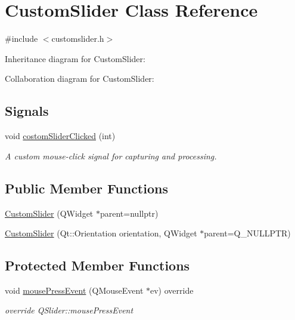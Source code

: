 \hypertarget{class_custom_slider}{}\section{Custom\+Slider Class Reference}
\label{class_custom_slider}


{\ttfamily \#include $<$customslider.\+h$>$}



Inheritance diagram for Custom\+Slider\+:


Collaboration diagram for Custom\+Slider\+:
\subsection*{Signals}
\begin{DoxyCompactItemize}
\item 
void \mbox{\hyperlink{class_custom_slider_a24568a4c3046d71a3a86e2c0e95faccb}{costom\+Slider\+Clicked}} (int)
\begin{DoxyCompactList}\small\item\em A custom mouse-\/click signal for capturing and processing. \end{DoxyCompactList}\end{DoxyCompactItemize}
\subsection*{Public Member Functions}
\begin{DoxyCompactItemize}
\item 
\mbox{\hyperlink{class_custom_slider_a339185f2fde98ed5032d5114f4cd1b41}{Custom\+Slider}} (Q\+Widget $\ast$parent=nullptr)
\item 
\mbox{\hyperlink{class_custom_slider_ac6fae8f3a172e2729cb32262b5b800ac}{Custom\+Slider}} (Qt\+::\+Orientation orientation, Q\+Widget $\ast$parent=Q\+\_\+\+N\+U\+L\+L\+P\+TR)
\end{DoxyCompactItemize}
\subsection*{Protected Member Functions}
\begin{DoxyCompactItemize}
\item 
void \mbox{\hyperlink{class_custom_slider_a2b0d4882ae9ac4b708d88de26c9578ba}{mouse\+Press\+Event}} (Q\+Mouse\+Event $\ast$ev) override
\begin{DoxyCompactList}\small\item\em override Q\+Slider\+::mouse\+Press\+Event \end{DoxyCompactList}\end{DoxyCompactItemize}


